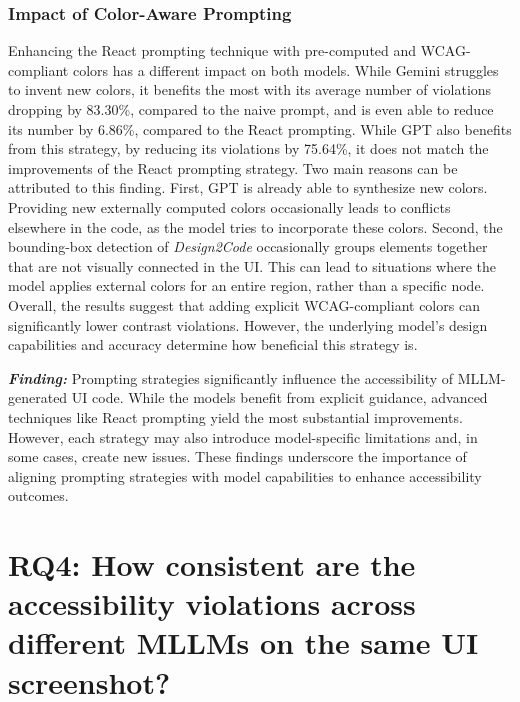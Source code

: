 \subsubsection{Impact of Color-Aware Prompting}
Enhancing the React prompting technique with pre-computed 
and WCAG-compliant colors has a different impact on both models.
While Gemini struggles to invent new colors, it 
benefits the most with its average number of violations 
dropping by 83.30\%, compared to the naive prompt, and 
is even able to reduce its number by 6.86\%, compared to 
the React prompting. While GPT also benefits from this 
strategy, by reducing its violations by 75.64\%, it does not
match the improvements of the React prompting strategy.\newline
Two main reasons can be attributed to this finding. First,
GPT is already able to synthesize new colors. Providing
new externally computed colors occasionally leads to
conflicts elsewhere in the code, as the model tries to
incorporate these colors. Second, the bounding-box detection
of \textit{Design2Code} occasionally groups elements
together that are not visually connected in the UI. This
can lead to situations where the model applies external
colors for an entire region, rather than a specific node.
Overall, the results suggest that adding explicit WCAG-compliant
colors can significantly lower contrast violations. However,
the underlying model's design capabilities and accuracy
determine how beneficial this strategy is.


\begin{center}
\begin{tcolorbox}[colback=black!5!white,colframe=black!75!black,bottom=-0.05pt,top=-0.05pt]
\textit{\textbf{Finding:}} Prompting strategies significantly 
influence the accessibility of MLLM-generated UI code. 
While the models benefit from explicit guidance, 
advanced techniques like React prompting yield the most 
substantial improvements. However, each strategy may also 
introduce model-specific limitations and, in some cases, 
create new issues. These findings underscore the importance 
of aligning prompting strategies with model capabilities 
to enhance accessibility outcomes.
\end{tcolorbox}
\end{center}


\section{RQ4: How consistent are the accessibility violations across different MLLMs on the same UI screenshot?}

